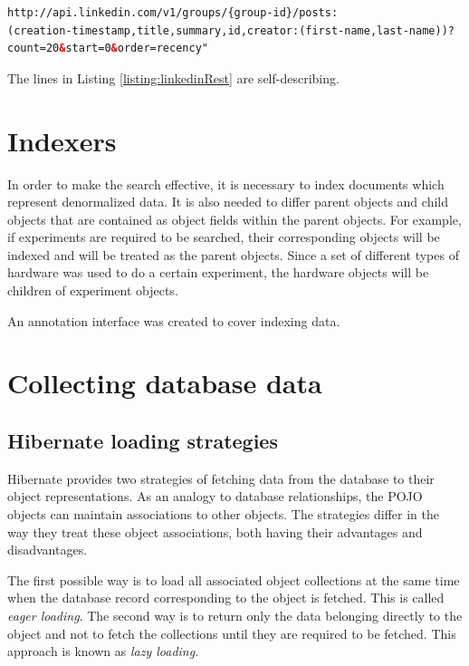 \documentclass[12pt, oneside, a4paper]{book}
\begin{document}
\begin{lstlisting}[language=HTML, caption={Example of a LinkedIn REST API call.}, label={listing:linkedinRest}]
http://api.linkedin.com/v1/groups/{group-id}/posts:
(creation-timestamp,title,summary,id,creator:(first-name,last-name))?
count=20&start=0&order=recency"

\end{lstlisting}

The lines in Listing \ref{listing:linkedinRest} are self-describing.


\section{Indexers}

In order to make the search effective, it is necessary to index documents which represent denormalized data.
It is also needed to differ parent objects and child objects that are contained as object fields within the parent objects.
For example, if experiments are required to be searched, their corresponding objects will be indexed and will be treated as the parent objects.
Since a set of different types of hardware was used to do a certain experiment, the hardware objects will be children of experiment objects.

An annotation interface was created to cover indexing data. 

\section{Collecting database data}


\subsection{Hibernate loading strategies}

Hibernate provides two strategies of fetching data from the database to their object representations. 
As an analogy to database relationships, the POJO objects can maintain associations to other objects. 
The strategies differ in the way they treat these object associations, both having their advantages and disadvantages. 

The first possible way is to load all associated object collections at the same time when the database record corresponding to the object is fetched. 
This is called \textit{eager loading}. 
The second way is to return only the data belonging directly to the object and not to fetch the collections until they are required to be fetched. 
This approach is known as \textit{lazy loading}. 
\end{document}
